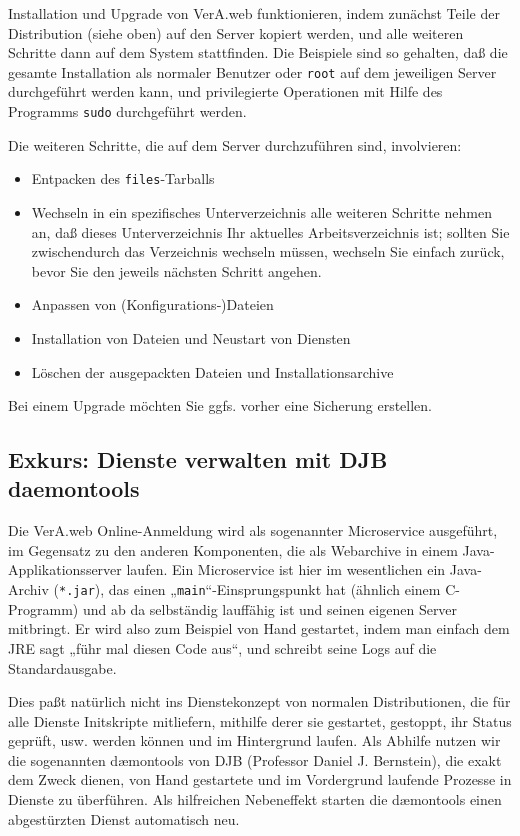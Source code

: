 \documentclass{tarentanleitung}
\begin{document}
Installation und Upgrade von VerA.web funktionieren, indem
zunächst Teile der Distribution (siehe oben) auf den Server
kopiert werden, und alle weiteren Schritte dann auf dem System
stattfinden. Die Beispiele sind so gehalten, daß die gesamte
Installation als normaler Benutzer oder \texttt{root} auf dem
jeweiligen
Server durchgeführt werden kann, und privilegierte Operationen
mit Hilfe des Programms \texttt{sudo} durchgeführt werden.

Die weiteren Schritte, die auf dem Server durchzuführen sind,
involvieren:\keinumbruch

\begin{itemize}
 \item{Entpacken des \texttt{files}-Tarballs}
 \item{Wechseln in ein spezifisches Unterverzeichnis \dash
  alle weiteren Schritte nehmen an, daß dieses Unterverzeichnis
  Ihr aktuelles Arbeitsverzeichnis ist; sollten Sie zwischendurch
  das Verzeichnis wechseln müssen, wechseln Sie einfach zurück,
  bevor Sie den jeweils nächsten Schritt angehen.}
 \item{Anpassen von (Konfigurations‑)Dateien}
 \item{Installation von Dateien und Neustart von Diensten}
 \item{Löschen der ausgepackten Dateien und Installationsarchive}
\end{itemize}

Bei einem Upgrade möchten Sie ggfs. vorher eine Sicherung erstellen.

\subsection{Exkurs: Dienste verwalten mit DJB daemontools}\label{subsec:intro-svc}

Die VerA.web Online-Anmeldung wird als sogenannter Microservice
ausgeführt, im Gegensatz zu den anderen Komponenten, die als
Webarchive in einem Java-Applikationsserver laufen. Ein Microservice
ist hier im wesentlichen ein Java-Archiv (\texttt{*.jar}), das einen
„\texttt{main}“-Einsprungspunkt hat (ähnlich einem C-Programm) und ab
da selbständig lauffähig ist und seinen eigenen Server mitbringt. Er
wird also zum Beispiel von Hand gestartet, indem man einfach dem JRE
sagt „führ mal diesen Code aus“, und schreibt seine Logs auf die
Standardausgabe.

Dies paßt natürlich nicht ins Dienstekonzept von normalen Distributionen,
die für alle Dienste Initskripte mitliefern, mithilfe derer sie gestartet,
gestoppt, ihr Status geprüft, usw. werden können und im Hintergrund laufen.
Als Abhilfe nutzen wir die sogenannten dæmontools von DJB (Professor Daniel
J. Bernstein), die exakt dem Zweck dienen, von Hand gestartete und im
Vordergrund laufende Prozesse in Dienste zu überführen. Als hilfreichen
Nebeneffekt starten die dæmontools einen abgestürzten Dienst automatisch neu.
\end{document}
